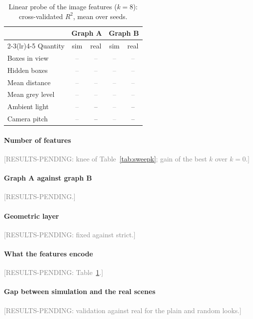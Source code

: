 \documentclass[conference]{IEEEtran}
\newcommand{\pending}{\textcolor{gray}{--}}
\begin{document}
\begin{table}[t]
\centering
\caption{Linear probe of the image features ($k=8$): cross-validated $R^2$, mean over seeds.}
\label{tab:probe}
\begin{tabular}{lcccc}
\toprule
 & \multicolumn{2}{c}{Graph A} & \multicolumn{2}{c}{Graph B} \\
\cmidrule(lr){2-3}\cmidrule(lr){4-5}
Quantity & sim & real & sim & real \\
\midrule
Boxes in view & \pending & \pending & \pending & \pending \\
Hidden boxes & \pending & \pending & \pending & \pending \\
Mean distance & \pending & \pending & \pending & \pending \\
Mean grey level & \pending & \pending & \pending & \pending \\
Ambient light & \pending & -- & \pending & -- \\
Camera pitch & \pending & -- & \pending & -- \\
\bottomrule
\end{tabular}
\end{table}

\paragraph{Number of features} \textcolor{gray}{[RESULTS-PENDING: knee of Table~\ref{tab:sweepk}; gain of the best
$k$ over $k=0$.]}

\paragraph{Graph A against graph B} \textcolor{gray}{[RESULTS-PENDING.]}

\paragraph{Geometric layer} \textcolor{gray}{[RESULTS-PENDING: fixed against strict.]}

\paragraph{What the features encode} \textcolor{gray}{[RESULTS-PENDING: Table~\ref{tab:probe}.]}

\paragraph{Gap between simulation and the real scenes} \textcolor{gray}{[RESULTS-PENDING: validation against real
for the plain and random looks.]}
\end{document}
